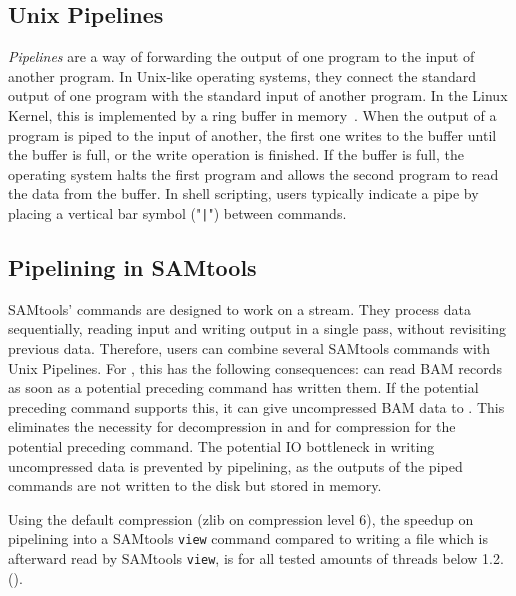\subsection{Unix Pipelines}

\textit{Pipelines} are a way of forwarding the output of one program to the input of another program. In Unix-like operating systems, they connect the standard output of one program with the standard input of another program. In the Linux Kernel, this is implemented by a ring buffer in memory~\cite{noauthor_linuxfspipec_nodate}. When the output of a program is piped to the input of another, the first one writes to the buffer until the buffer is full, or the write operation is finished. If the buffer is full, the operating system halts the first program and allows the second program to read the data from the buffer. In shell scripting, users typically indicate a pipe by placing a vertical bar symbol ("\texttt{|}") between commands.



\subsection{Pipelining in SAMtools}
SAMtools' commands are designed to work on a stream. They process data sequentially, reading input and writing output in a single pass, without revisiting previous data.
Therefore, users can combine several SAMtools commands with Unix Pipelines. For \sort, this has the following consequences: \sort can read BAM records as soon as a potential preceding command has written them. If the potential preceding command supports this, it can give uncompressed BAM data to \sort. This eliminates the necessity for decompression in \sort and for compression for the potential preceding command. The potential IO bottleneck in writing uncompressed data is prevented by pipelining, as the outputs of the piped commands are not written to the disk but stored in memory.

Using the default compression (zlib on compression level 6), the speedup on pipelining \sort into a SAMtools \texttt{view} command compared to \sort writing a file which is afterward read by SAMtools \texttt{view}, is for all tested amounts of threads below 1.2.().

